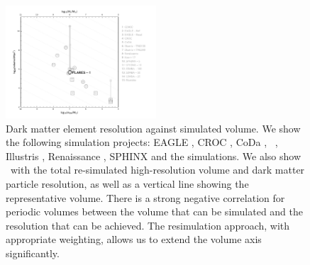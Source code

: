 \begin{figure}
	\includegraphics[width=0.5\textwidth]{images/volume_resolution.pdf}
    \caption{Dark matter element resolution against simulated volume.
    We show the following simulation projects: EAGLE \protect\citep{schaye_eagle_2015,crain_eagle_2015}, CROC \protect\citep{gnedin_cosmic_2014}, CoDa \protect\citep{ocvirk_cosmic_2016}, \bluetides\ \protect\citep{feng_bluetides_2016}, Illustris \protect\citep{vogelsberger_introducing_2014}, Renaissance \protect\citep{barrow_first_2017}, SPHINX \protect\citep{rosdahl_sphinx_2018} and the \protect\cite{katz_interpreting_2017} simulations.
    We also show \flares\ with the total re-simulated high-resolution volume and dark matter particle resolution, as well as a vertical line showing the representative volume.
    There is a strong negative correlation for periodic volumes between the volume that can be simulated and the resolution that can be achieved.
    The resimulation approach, with appropriate weighting, allows us to extend the volume axis significantly.
		}
    \label{fig:volume_resolution}
\end{figure}
